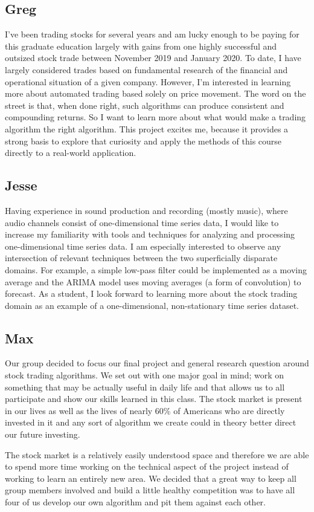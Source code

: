 \documentclass[12pt,english]{article}
\begin{document}
\subsection*{Greg}
I’ve been trading stocks for several years and am lucky enough to be paying for this graduate education largely with gains from one highly successful and outsized stock trade between November 2019 and January 2020. To date, I have largely considered trades based on fundamental research of the financial and operational situation of a given company. However, I’m interested in learning more about automated trading based solely on price movement. The word on the street is that, when done right, such algorithms can produce consistent and compounding returns. So I want to learn more about what would make a trading algorithm the right algorithm. This project excites me, because it provides a strong basis to explore that curiosity and apply the methods of this course directly to a real-world application.
\subsection*{Jesse}
Having experience in sound production and recording (mostly music), where audio channels consist of one-dimensional time series data, I would like to increase my familiarity with tools and techniques for analyzing and processing one-dimensional time series data. I am especially interested to observe any intersection of relevant techniques between the two superficially disparate domains. For example, a simple low-pass filter could be implemented as a moving average and the ARIMA model uses moving averages (a form of convolution) to forecast. As a student, I look forward to learning more about the stock trading domain as an example of a one-dimensional, non-stationary time series dataset.
\newpage
\subsection*{Max}
Our group decided to focus our final project and general research question around stock trading algorithms. We set out with one major goal in mind; work on something that may be actually useful in daily life and that allows us to all participate and show our skills learned in this class. The stock market is present in our lives as well as the lives of nearly 60\% of Americans who are directly invested in it and any sort of algorithm we create could in theory better direct our future investing. 

The stock market is a relatively easily understood space and therefore we are able to spend more time working on the technical aspect of the project instead of working to learn an entirely new area. We decided that a great way to keep all group members involved and build a little healthy competition was to have all four of us develop our own algorithm and pit them against each other. 
\end{document}
